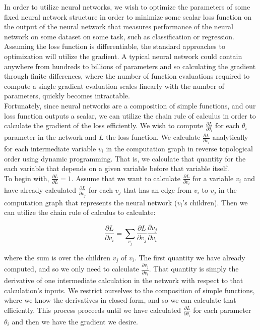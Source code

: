 \documentclass{article}
\begin{document}
In order to utilize neural networks, we wish to optimize the parameters of some fixed neural network structure in order to minimize some scalar loss function on the output of the neural network that measures
performance of the neural network on some dataset on some task, such as classification or regression.
Assuming the loss function is differentiable, the standard approaches to optimization will utilize the gradient.
A typical neural network could contain anywhere from hundreds to billions of parameters and so calculating the gradient through finite differences, where the number of function evaluations
required to compute a single gradient evaluation scales linearly with the number of parameters, quickly becomes intractable.
\\

Fortunately, since neural networks are a composition of simple functions, and our loss function outputs a scalar, we can utilize the chain rule of calculus in order to calculate the gradient of the loss efficiently.
We wish to compute $\frac{\partial L}{\partial \theta_i}$ for each $\theta_i$ parameter in the network and $L$ the loss function.
We calculate $\frac{\partial L}{\partial v_i}$ analytically for each intermediate variable $v_i$ in the computation graph in reverse topological order using dynamic programming.
That is, we calculate that quantity for the each variable that depends on a given variable before that variable itself.
\\

To begin with, $\frac{\partial L}{\partial L} = 1$.
Assume that we want to calculate $\frac{\partial L}{\partial v_i}$ for a variable $v_i$ and have already calculated $\frac{\partial L}{\partial v_j}$ for each $v_j$
that has an edge from $v_i$ to $v_j$ in the computation graph that represents the neural network ($v_i$'s children).
Then we can utilize the chain rule of calculus to calculate:

\[
    \frac{\partial L}{\partial v_i} = \sum_{v_j} \frac{\partial L}{\partial v_j} \frac{\partial v_j}{\partial v_i}
\]

where the sum is over the children $v_j$ of $v_i$.
The first quantity we have already computed, and so we only need to calculate $\frac{\partial v_j}{\partial v_i}$.
That quantity is simply the derivative of one intermediate calculation in the network with respect to that calculation's inputs.
We restrict ourselves to the composition of simple functions, where we know the derivatives in closed form, and so we can calculate that efficiently.
This process proceeds until we have calculated $\frac{\partial L}{\partial \theta_i}$ for each parameter $\theta_i$ and then we have the gradient we desire.
\end{document}

